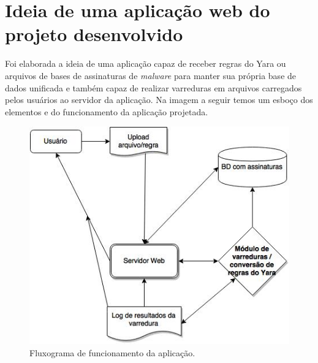 \section{Ideia de uma aplicação web do projeto desenvolvido}
\label{s.prototipo}

Foi elaborada a ideia de uma aplicação capaz de receber regras do Yara ou
arquivos de bases de assinaturas de \textit{malware} para manter sua própria
base de dados unificada e também capaz de realizar varreduras em arquivos
carregados pelos usuários ao servidor da aplicação. Na imagem a seguir temos um
esboço dos elementos e do funcionamento da aplicação projetada.

\begin{figure}[H]
  \includegraphics[scale=0.6]{figs/flux_prototipo}
  \centering
  \caption{Fluxograma de funcionamento da aplicação.}
  \label{f.flux_prototipo}
\end{figure}

